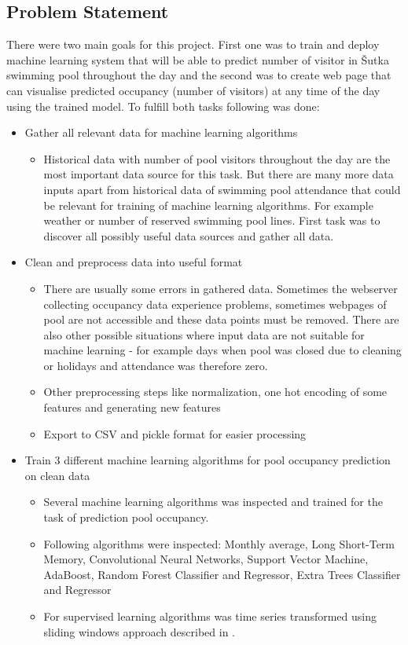 \documentclass{article}
\begin{document}
\subsection{Problem Statement} \label{sec:problem_statement}

There were two main goals for this project. First one was to train and deploy machine learning system that will be able to predict number of visitor in \v{S}utka swimming pool throughout the day and the second was to create web page that can visualise predicted occupancy (number of visitors) at any time of the day using the trained model. To fulfill both tasks following was done:

\begin{itemize}
\item Gather all relevant data for machine learning algorithms
\begin{itemize}
\item Historical data with number of pool visitors throughout the day are the most important data source for this task. But there are many more data inputs apart from historical data of swimming pool attendance that could be relevant for training of machine learning algorithms. For example weather or number of reserved swimming pool lines. First task was to discover all possibly useful data sources and gather all data.
\end{itemize}

\item Clean and preprocess data into useful format
\begin{itemize}
\item There are usually some errors in gathered data. Sometimes the webserver collecting occupancy data experience problems, sometimes webpages of pool are not accessible and these data points must be removed. There are also other possible situations where input data are not suitable for machine learning - for example days when pool was closed due to cleaning or holidays and attendance was therefore zero. 
\item Other preprocessing steps like normalization, one hot encoding of some features and generating new features
\item Export to CSV and pickle format for easier processing
\end{itemize}

\item Train 3 different machine learning algorithms for pool occupancy prediction on clean data
\begin{itemize}
\item Several machine learning algorithms was inspected and trained for the task of prediction pool occupancy. 
\item Following algorithms were inspected: Monthly average, Long Short-Term Memory, Convolutional Neural Networks, Support Vector Machine, AdaBoost, Random Forest Classifier and Regressor, Extra Trees Classifier and Regressor
\item For supervised learning algorithms was time series transformed using sliding windows approach described in \citep{brownlee2019howtosupervised}.
\end{itemize}


\end{itemize}
\end{document}
